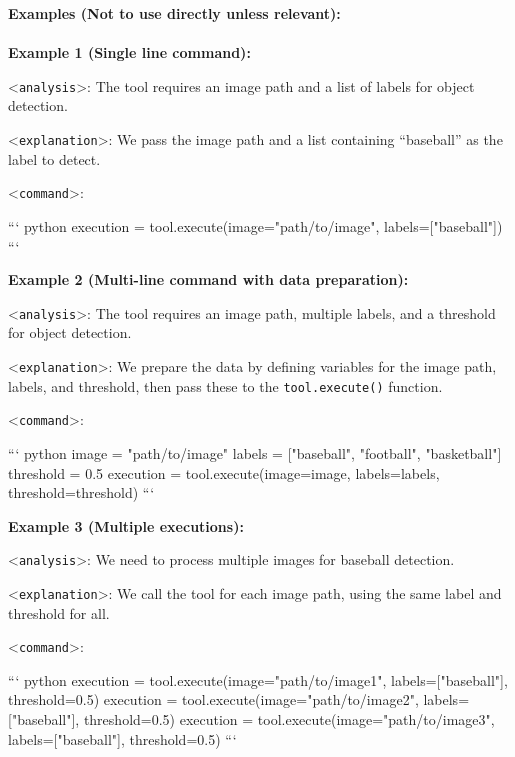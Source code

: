 \begin{textcolorbox}

\textbf{Examples (Not to use directly unless relevant):}
\\\\
\textbf{Example 1 (Single line command):}

 \textless{}\texttt{analysis}\textgreater{}: The tool requires an image path and a list of labels for object detection.
 
\textless{}\texttt{explanation}\textgreater{}: We pass the image path and a list containing ``baseball'' as the label to detect.

\textless{}\texttt{command}\textgreater{}:
\begin{codebox}
```
python
execution = tool.execute(image="path/to/image", labels=["baseball"])
```
\end{codebox}

\textbf{Example 2 (Multi-line command with data preparation):}

\textless{}\texttt{analysis}\textgreater{}: The tool requires an image path, multiple labels, and a threshold for object detection.

\textless{}\texttt{explanation}\textgreater{}: We prepare the data by defining variables for the image path, labels, and threshold, then pass these to the \texttt{tool.execute()} function.

\textless{}\texttt{command}\textgreater{}:
\begin{codebox}
```
python
image = "path/to/image"
labels = ["baseball", "football", "basketball"]
threshold = 0.5
execution = tool.execute(image=image, labels=labels, threshold=threshold)
```
\end{codebox}


\textbf{Example 3 (Multiple executions):}

\textless{}\texttt{analysis}\textgreater{}: We need to process multiple images for baseball detection.

\textless{}\texttt{explanation}\textgreater{}: We call the tool for each image path, using the same label and threshold for all.

\textless{}\texttt{command}\textgreater{}:
\begin{codebox}
```
python
execution = tool.execute(image="path/to/image1", labels=["baseball"], threshold=0.5)
execution = tool.execute(image="path/to/image2", labels=["baseball"], threshold=0.5)
execution = tool.execute(image="path/to/image3", labels=["baseball"], threshold=0.5)
```
\end{codebox}
\end{textcolorbox}


